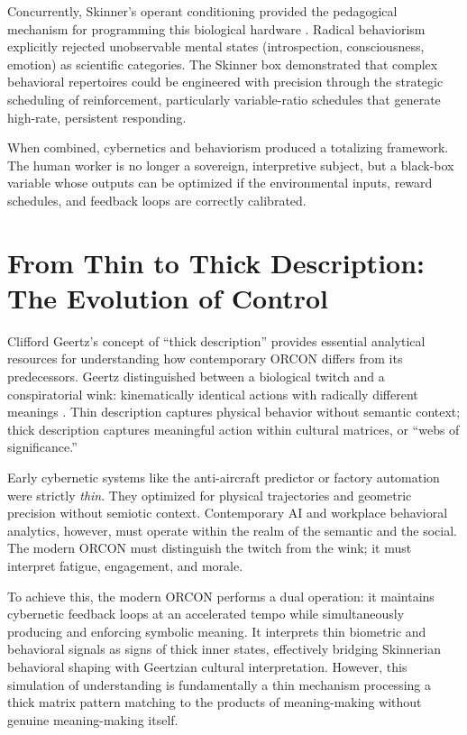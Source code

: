 \documentclass[11pt, a4paper]{article}
\begin{document}
Concurrently, Skinner's operant conditioning provided the pedagogical mechanism for programming this biological hardware \cite{skinner1953science}. Radical behaviorism explicitly rejected unobservable mental states (introspection, consciousness, emotion) as scientific categories. The Skinner box demonstrated that complex behavioral repertoires could be engineered with precision through the strategic scheduling of reinforcement, particularly variable-ratio schedules that generate high-rate, persistent responding.

When combined, cybernetics and behaviorism produced a totalizing framework. The human worker is no longer a sovereign, interpretive subject, but a black-box variable whose outputs can be optimized if the environmental inputs, reward schedules, and feedback loops are correctly calibrated.

\section{From Thin to Thick Description: The Evolution of Control}

Clifford Geertz's concept of ``thick description'' provides essential analytical resources for understanding how contemporary ORCON differs from its predecessors. Geertz distinguished between a biological twitch and a conspiratorial wink: kinematically identical actions with radically different meanings \cite{geertz1973interpretation}. Thin description captures physical behavior without semantic context; thick description captures meaningful action within cultural matrices, or ``webs of significance.''

Early cybernetic systems like the anti-aircraft predictor or factory automation were strictly \textit{thin}. They optimized for physical trajectories and geometric precision without semiotic context. Contemporary AI and workplace behavioral analytics, however, must operate within the realm of the semantic and the social. The modern ORCON must distinguish the twitch from the wink; it must interpret fatigue, engagement, and morale. 

To achieve this, the modern ORCON performs a dual operation: it maintains cybernetic feedback loops at an accelerated tempo while simultaneously producing and enforcing symbolic meaning. It interprets thin biometric and behavioral signals as signs of thick inner states, effectively bridging Skinnerian behavioral shaping with Geertzian cultural interpretation. However, this simulation of understanding is fundamentally a thin mechanism processing a thick matrix pattern matching to the products of meaning-making without genuine meaning-making itself.
\end{document}
